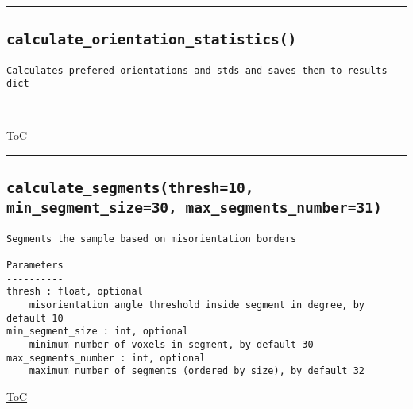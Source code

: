 \documentclass{article}
\begin{document}


\vspace{5mm}

\hrule

\subsection*{\texttt{calculate\_orientation\_statistics()}}

\begin{lstlisting}[language=docstring]
Calculates prefered orientations and stds and saves them to results dict

    
\end{lstlisting}

\begin{flushright}

\hyperref[toc]{ToC}

\end{flushright}



\vspace{5mm}

\hrule

\subsection*{\texttt{calculate\_segments(thresh=10, min\_segment\_size=30, max\_segments\_number=31)}}

\begin{lstlisting}[language=docstring]
Segments the sample based on misorientation borders

Parameters
----------
thresh : float, optional
    misorientation angle threshold inside segment in degree, by default 10
min_segment_size : int, optional
    minimum number of voxels in segment, by default 30
max_segments_number : int, optional
    maximum number of segments (ordered by size), by default 32
\end{lstlisting}

\begin{flushright}

\hyperref[toc]{ToC}

\end{flushright}


\end{document}

